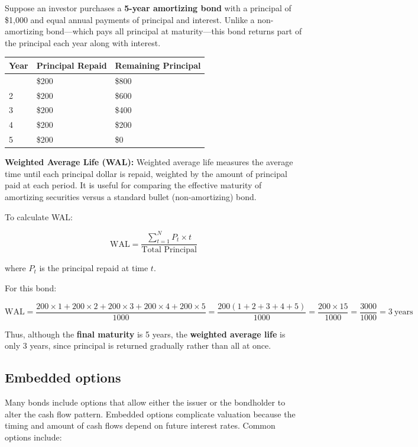 \documentclass[
  letterpaper,
  DIV=11,
  numbers=noendperiod]{scrartcl}
\begin{document}
Suppose an investor purchases a \textbf{5-year amortizing bond} with a
principal of \$1,000 and equal annual payments of principal and
interest. Unlike a non-amortizing bond---which pays all principal at
maturity---this bond returns part of the principal each year along with
interest.

\begin{longtable}[]{@{}lll@{}}
\toprule\noalign{}
Year & Principal Repaid & Remaining Principal \\
\midrule\noalign{}
\endhead
\bottomrule\noalign{}
\endlastfoot
1 & \$200 & \$800 \\
2 & \$200 & \$600 \\
3 & \$200 & \$400 \\
4 & \$200 & \$200 \\
5 & \$200 & \$0 \\
\end{longtable}

\textbf{Weighted Average Life (WAL):} Weighted average life measures the
average time until each principal dollar is repaid, weighted by the
amount of principal paid at each period. It is useful for comparing the
effective maturity of amortizing securities versus a standard bullet
(non-amortizing) bond.

To calculate WAL:

\[
\text{WAL} = \frac{\sum_{t=1}^{N} P_t \times t}{\text{Total Principal}}
\]

where \(P_t\) is the principal repaid at time \(t\).

For this bond:

\[
\text{WAL} = \frac{200 \times 1 + 200 \times 2 + 200 \times 3 + 200 \times 4 + 200 \times 5}{1000} = \frac{200 (1+2+3+4+5)}{1000} = \frac{200 \times 15}{1000} = \frac{3000}{1000} = 3\ \text{years}
\]

Thus, although the \textbf{final maturity} is 5 years, the
\textbf{weighted average life} is only 3 years, since principal is
returned gradually rather than all at once.

\subsection{Embedded options}\label{embedded-options}

Many bonds include options that allow either the issuer or the
bondholder to alter the cash flow pattern. Embedded options complicate
valuation because the timing and amount of cash flows depend on future
interest rates. Common options include:
\end{document}

